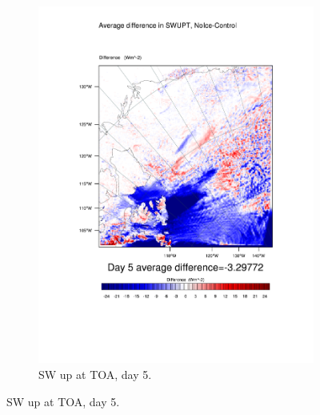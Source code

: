 \begin{figure}
\begin{subfigure}{0.48\textwidth}
		\includegraphics[width=\textwidth]{results/noice/diff_NoIce_SWUPT_Day5.pdf}
		\caption{SW up at TOA, day 5.}
		\label{subfig:swup_r2Day5}
	\end{subfigure}
	

\end{figure}
